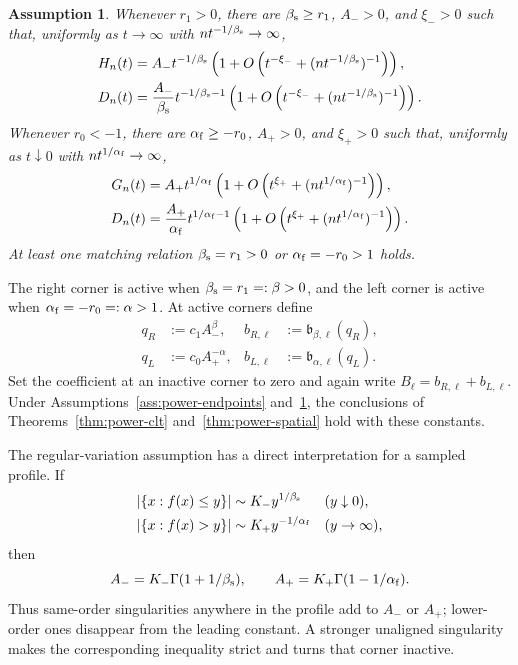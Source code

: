 \documentclass[11pt]{article}
\theoremstyle{remark}
\theoremstyle{plain}
\newtheorem{assumption}[theorem]{Assumption}
\begin{document}
\begin{assumption}\label{ass:power-population}
Whenever $r_1>0$, there are $\beta_{\rm s}\ge r_1$, $A_->0$, and $\xi_->0$
such that, uniformly as $t\to\infty$ with
$nt^{-1/\beta_{\rm s}}\to\infty$,
\begin{align}
 H_n(t)&=A_-t^{-1/\beta_{\rm s}}
 \left(1+O\left(t^{-\xi_-}
 +(nt^{-1/\beta_{\rm s}})^{-1}\right)\right),
 \label{eq:power-discrete-laplace}\\
 D_n(t)&=\frac{A_-}{\beta_{\rm s}}t^{-1/\beta_{\rm s}-1}
 \left(1+O\left(t^{-\xi_-}
 +(nt^{-1/\beta_{\rm s}})^{-1}\right)\right).
 \label{eq:power-discrete-weighted-laplace}
\end{align}
Whenever $r_0<-1$, there are $\alpha_{\rm f}\ge-r_0$, $A_+>0$, and
$\xi_+>0$ such that, uniformly as $t\downarrow0$ with
$nt^{1/\alpha_{\rm f}}\to\infty$,
\begin{align}
 G_n(t)&=A_+t^{1/\alpha_{\rm f}}
 \left(1+O\left(t^{\xi_+}
 +(nt^{1/\alpha_{\rm f}})^{-1}\right)\right),
 \label{eq:power-discrete-arrivals}\\
 D_n(t)&=\frac{A_+}{\alpha_{\rm f}}t^{1/\alpha_{\rm f}-1}
 \left(1+O\left(t^{\xi_+}
 +(nt^{1/\alpha_{\rm f}})^{-1}\right)\right).
 \label{eq:power-discrete-arrival-weight}
\end{align}
At least one matching relation $\beta_{\rm s}=r_1>0$ or
$\alpha_{\rm f}=-r_0>1$ holds.
\end{assumption}

The right corner is active when $\beta_{\rm s}=r_1=:\beta>0$, and the left
corner is active when $\alpha_{\rm f}=-r_0=:\alpha>1$.  At active corners
define
\begin{align}
 q_R&:=c_1A_-^\beta,
 &b_{R,\ell}&:=\mathfrak b_{\beta,\ell}(q_R),
 \label{eq:general-q-right}\\
 q_L&:=c_0A_+^{-\alpha},
 &b_{L,\ell}&:=\mathfrak b_{\alpha,\ell}(q_L).
 \label{eq:general-q-left}
\end{align}
Set the coefficient at an inactive corner to zero and again write
$B_\ell=b_{R,\ell}+b_{L,\ell}$.  Under
Assumptions~\ref{ass:power-endpoints} and~\ref{ass:power-population},
the conclusions of Theorems~\ref{thm:power-clt}
and~\ref{thm:power-spatial} hold with these constants.

The regular-variation assumption has a direct interpretation for a sampled
profile.  If
\begin{align*}
 |\{x:f(x)\le y\}|&\sim K_-y^{1/\beta_{\rm s}}
 &&(y\downarrow0),\\
 |\{x:f(x)>y\}|&\sim K_+y^{-1/\alpha_{\rm f}}
 &&(y\to\infty),
\end{align*}
then
\[
 A_-=K_-\Gamma(1+1/\beta_{\rm s}),\qquad
 A_+=K_+\Gamma(1-1/\alpha_{\rm f}).
\]
Thus same-order singularities anywhere in the profile add to $A_-$ or
$A_+$; lower-order ones disappear from the leading constant.  A stronger
unaligned singularity makes the corresponding inequality strict and turns
that corner inactive.
\end{document}
